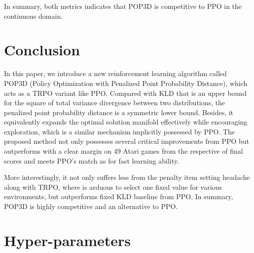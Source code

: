 \documentclass{article}
\begin{document}
In summary, both metrics indicates that POP3D is competitive to PPO in the continuous domain.







\section{Conclusion}

In this paper, we introduce a new reinforcement learning algorithm called POP3D (Policy Optimization with Penalized Point Probability Distance), which acts as a TRPO variant like PPO. Compared with KLD that is an upper bound for the square of total variance divergence between two distributions, the penalized point probability distance is a symmetric lower bound. Besides, it equivalently  expands the optimal solution manifold effectively while encouraging exploration, which is a similar mechanism implicitly possessed by PPO. The proposed method not only possesses several critical improvements from PPO but outperforms with a clear margin on 49  Atari games from the respective of final scores and meets PPO's match as for fast learning ability. 

More interestingly, it not only suffers less from the penalty item setting headache along with TRPO, where is arduous to select one fixed value for various environments, but outperforms fixed KLD baseline from PPO. In summary, POP3D is highly competitive and an alternative to PPO.\\
\clearpage


\newpage

\appendix
\section{Hyper-parameters}
\end{document}
